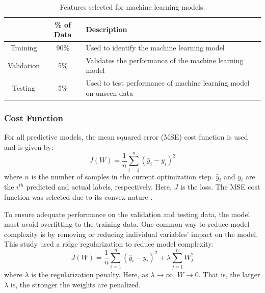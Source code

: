 \begin{table}[h]
    \centering
    {
    \begin{tabular}{ c | c | p{9cm}}
                            & \% of Data        &  Description \\
        \hline
        Training            &  90\%             
        &  Used to identify the machine learning model        \\
        
        Validation          &  5\%              
        &  Validates the performance of the machine learning model         \\
        
        Testing             &  5\%             
        &  Used to test performance of machine learning model on unseen data       \\             
    \end{tabular}}
    \caption{Features selected for machine learning models.}
    \label{tab:08datapart}
\end{table}

\subsubsection{Cost Function}

For all predictive models, the mean squared error (MSE) cost function is used and is given by:
\begin{equation}
    J(W) = \frac{1}{n}\sum\limits^n_{i=1}(\hat{y}_i - y_i)^2
    \label{eq:08MSE}
\end{equation}
where $n$ is the number of samples in the current optimization step.  $\hat{y}_i$ and $y_i$ are the $i^{th}$ predicted and actual labels, respectively. Here, $J$ is the loss. The MSE cost function was selected due to its convex nature \cite{deeplearning_course}.

To ensure adequate performance on the validation and testing data, the model must avoid overfitting to the training data.  One common way to reduce model complexity is by removing or reducing individual variables' impact on the model.  This study used a ridge regularization to reduce model complexity:
\begin{equation}
    J(W) = \frac{1}{n}\sum\limits^n_{i=1}(\hat{y}_i - y_i)^2 + \lambda \sum\limits^n_{j=1} W_j^2
    \label{eq:08MSE_wR}
\end{equation}
where $\lambda$ is the regularization penalty.  Here, as $\lambda \rightarrow \infty$, $W \rightarrow 0$.  That is, the larger $\lambda$ is, the stronger the weights are penalized. 

